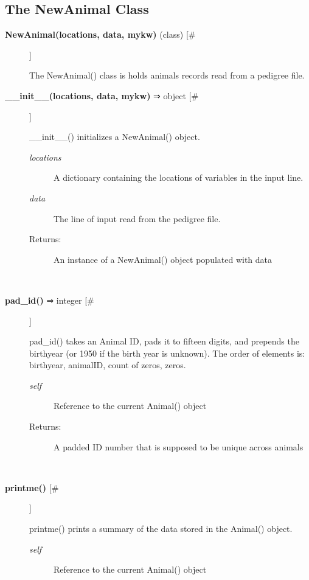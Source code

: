\subsection*{The NewAnimal Class}
\begin{description}
\item[\textbf{NewAnimal(locations, data, mykw)}
 (class) [\#]]

 The NewAnimal() class is holds animals records read from a pedigree file.

\item[\textbf{\_\_init\_\_(locations, data, mykw)}
 ⇒ object [\#]]

 \_\_init\_\_() initializes a NewAnimal() object.
\begin{description}
\item[\emph{locations}
] A dictionary containing the locations of variables in the input line.
\item[\emph{data}
] The line of input read from the pedigree file.
\item[Returns:] An instance of a NewAnimal() object populated with data

\end{description}
\\ 

\item[\textbf{pad\_id()}
 ⇒ integer [\#]]

 pad\_id() takes an Animal ID, pads it to fifteen digits, and prepends the birthyear (or 1950 if the birth year is unknown). The order of elements is: birthyear, animalID, count of zeros, zeros.
\begin{description}
\item[\emph{self}
] Reference to the current Animal() object
\item[Returns:] A padded ID number that is supposed to be unique across animals

\end{description}
\\ 

\item[\textbf{printme()}
 [\#]]

 printme() prints a summary of the data stored in the Animal() object.
\begin{description}
\item[\emph{self}
] Reference to the current Animal() object

\end{description}
\\ 


\end{description}

